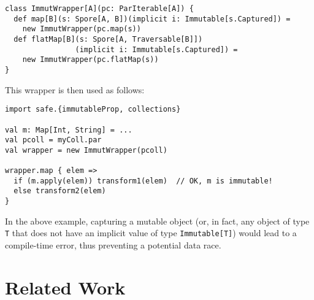 \documentclass{llncs}
\begin{document}
\begin{verbatim}
class ImmutWrapper[A](pc: ParIterable[A]) {
  def map[B](s: Spore[A, B])(implicit i: Immutable[s.Captured]) =
    new ImmutWrapper(pc.map(s))
  def flatMap[B](s: Spore[A, Traversable[B]])
                (implicit i: Immutable[s.Captured]) =
    new ImmutWrapper(pc.flatMap(s))
}
\end{verbatim}
\noindent
This wrapper is then used as follows:

\begin{verbatim}
import safe.{immutableProp, collections}

val m: Map[Int, String] = ...
val pcoll = myColl.par
val wrapper = new ImmutWrapper(pcoll)

wrapper.map { elem =>
  if (m.apply(elem)) transform1(elem)  // OK, m is immutable!
  else transform2(elem)
}
\end{verbatim}
\noindent
In the above example, capturing a mutable object (or, in fact, any object of type \verb|T| that does not have an implicit value of type \verb|Immutable[T]|) would lead to a compile-time error, thus preventing a potential data race.





\section{Related Work}
\end{document}
